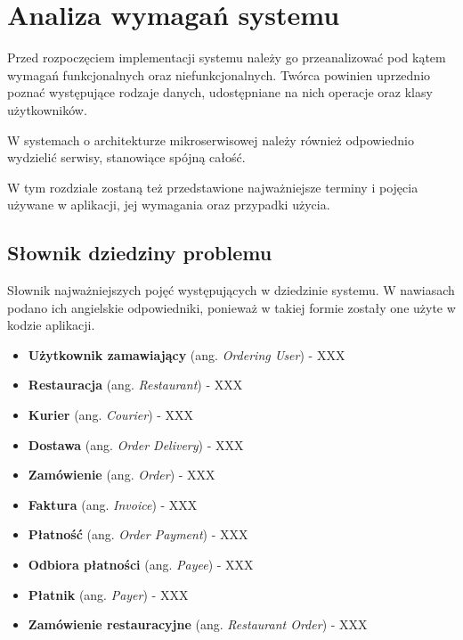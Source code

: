 \clearpage %

\section{Analiza wymagań systemu}

Przed rozpoczęciem implementacji systemu należy go przeanalizować pod kątem wymagań funkcjonalnych oraz niefunkcjonalnych. Twórca powinien uprzednio poznać występujące rodzaje danych, udostępniane na nich operacje oraz klasy użytkowników.

W systemach o architekturze mikroserwisowej należy również odpowiednio wydzielić serwisy, stanowiące spójną całość.

W tym rozdziale zostaną też przedstawione najważniejsze terminy i pojęcia używane w aplikacji, jej wymagania oraz przypadki użycia.

\subsection{Słownik dziedziny problemu}

Słownik najważniejszych pojęć występujących w dziedzinie systemu. W nawiasach podano ich angielskie odpowiedniki, ponieważ w takiej formie zostały one użyte w kodzie aplikacji.

\begin{itemize}

    \item \textbf{Użytkownik zamawiający} (ang. \textit{Ordering User}) - XXX
    \item \textbf{Restauracja} (ang. \textit{Restaurant}) - XXX
    \item \textbf{Kurier} (ang. \textit{Courier}) - XXX
    \item \textbf{Dostawa} (ang. \textit{Order Delivery}) - XXX
    \item \textbf{Zamówienie} (ang. \textit{Order}) - XXX
    \item \textbf{Faktura} (ang. \textit{Invoice}) - XXX
    \item \textbf{Płatność} (ang. \textit{Order Payment}) - XXX
    \item \textbf{Odbiora płatności} (ang. \textit{Payee}) - XXX
    \item \textbf{Płatnik} (ang. \textit{Payer}) - XXX
    \item \textbf{Zamówienie restauracyjne} (ang. \textit{Restaurant Order}) - XXX

\end{itemize}

